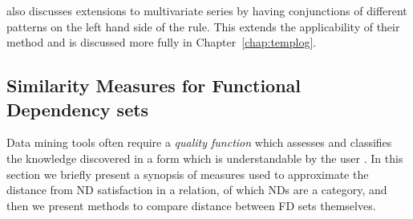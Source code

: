 \cite{dlm98} also discusses extensions to multivariate series by
having conjunctions of different patterns on the left hand side of the
rule. This extends the applicability of their method and is discussed
more fully in Chapter~\ref{chap:templog}.




\subsection{Similarity Measures for Functional Dependency sets}\label{subsec:rev_fd_sim}


Data mining tools often require a {\em quality function} which assesses
 and classifies the knowledge discovered in a form which is understandable
by the user \cite{hs94}. In this section we briefly present a synopsis
 of measures used to approximate the distance from ND satisfaction in a
 relation, of which NDs are a category, and then we present methods to
 compare distance between FD sets themselves. 



